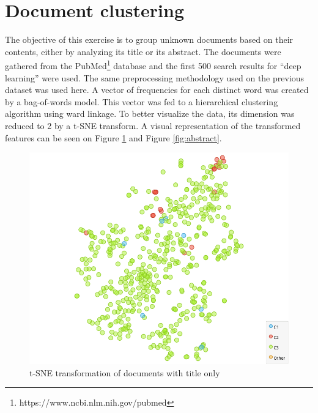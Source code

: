 \documentclass{article}
\begin{document}
\section*{Document clustering}

The objective of this exercise is to group unknown documents based on their contents, either by analyzing its title or its abstract. The documents were gathered from the PubMed\footnote{https://www.ncbi.nlm.nih.gov/pubmed} database and the first 500 search results for ``deep learning'' were used. The same preprocessing methodology used on the previous dataset was used here. A vector of frequencies for each distinct word was created by a bag-of-words model. This vector was fed to a hierarchical clustering algorithm using ward linkage. To better visualize the data, its dimension was reduced to 2 by a t-SNE transform. A visual representation of the transformed features can be seen on Figure \ref{fig:titulo} and Figure \ref{fig:abstract}.

\begin{figure}[htbp]
    \centering
    \includegraphics[scale=0.3]{tsne_title.png}
    \caption{t-SNE transformation of documents with title only}
    \label{fig:titulo}
\end{figure}
\end{document}
